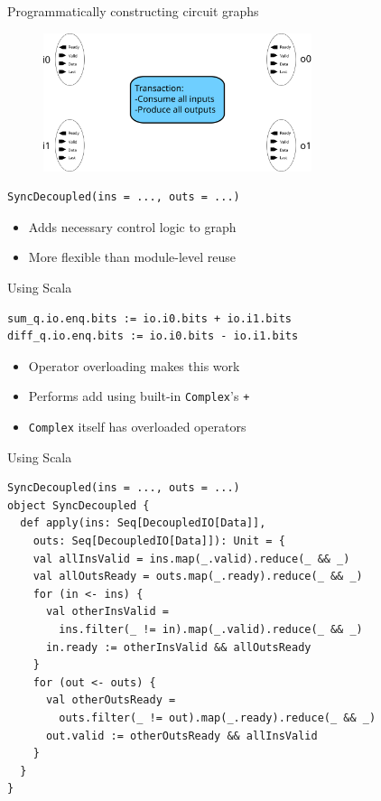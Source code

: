 \documentclass{beamer}
\newcommand{\gwidth}[0]{0.7\textwidth}
\begin{document}
\begin{frame}[fragile]{Programmatically constructing circuit graphs}
  \begin{figure}
    \centering
    \includegraphics[width=\gwidth]{figs/sync_decoupled.svg}
  \end{figure}
  \small
\begin{verbatim}
SyncDecoupled(ins = ..., outs = ...)
\end{verbatim} 
\normalsize
\begin{itemize}
  \item Adds necessary control logic to graph
  \item More flexible than module-level reuse
\end{itemize}
\end{frame}

\begin{frame}[fragile]{Using Scala}
  \small
\begin{verbatim}
sum_q.io.enq.bits := io.i0.bits + io.i1.bits
diff_q.io.enq.bits := io.i0.bits - io.i1.bits
\end{verbatim}
\normalsize
\begin{itemize}
\item Operator overloading makes this work
\item Performs add using built-in \texttt{Complex}'s \texttt{+}
\item \texttt{Complex} itself has overloaded operators
\end{itemize}
\end{frame}

\begin{frame}[fragile]{Using Scala}
  \small
\begin{verbatim}
SyncDecoupled(ins = ..., outs = ...)
object SyncDecoupled {
  def apply(ins: Seq[DecoupledIO[Data]],
    outs: Seq[DecoupledIO[Data]]): Unit = {
    val allInsValid = ins.map(_.valid).reduce(_ && _)
    val allOutsReady = outs.map(_.ready).reduce(_ && _)
    for (in <- ins) {
      val otherInsValid =
        ins.filter(_ != in).map(_.valid).reduce(_ && _)
      in.ready := otherInsValid && allOutsReady
    }
    for (out <- outs) {
      val otherOutsReady =
        outs.filter(_ != out).map(_.ready).reduce(_ && _)
      out.valid := otherOutsReady && allInsValid
    }
  }
}
\end{verbatim}
\normalsize
\end{frame}
\end{document}
